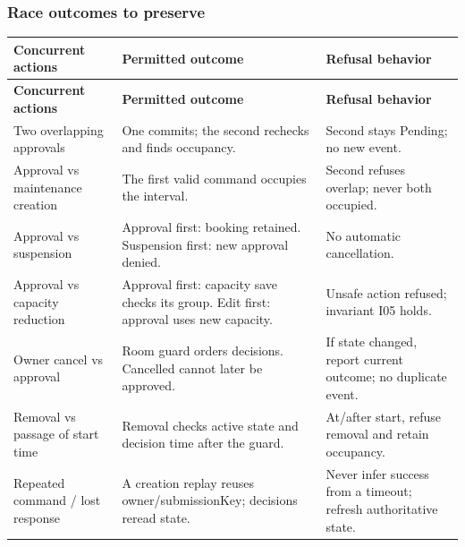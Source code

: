 \subsubsection{Race outcomes to preserve}

\begin{longtable}{|p{}|p{}|p{}|}

\hline

\textbf{Concurrent actions} & \textbf{Permitted outcome} & \textbf{Refusal behavior} \\ \hline

\endfirsthead

\hline

\textbf{Concurrent actions} & \textbf{Permitted outcome} & \textbf{Refusal behavior} \\ \hline

\endhead

Two overlapping approvals & One commits; the second rechecks and finds occupancy.\allowbreak{} & Second stays Pending; no new event.\allowbreak{} \\ \hline

Approval vs maintenance creation & The first valid command occupies the interval.\allowbreak{} & Second refuses overlap; never both occupied.\allowbreak{} \\ \hline

Approval vs suspension & Approval first: booking retained.\allowbreak{} Suspension first: new approval denied.\allowbreak{} & No automatic cancellation.\allowbreak{} \\ \hline

Approval vs capacity reduction & Approval first: capacity save checks its group.\allowbreak{} Edit first: approval uses new capacity.\allowbreak{} & Unsafe action refused; invariant I05 holds.\allowbreak{} \\ \hline

Owner cancel vs approval & Room guard orders decisions.\allowbreak{} Cancelled cannot later be approved.\allowbreak{} & If state changed, report current outcome; no duplicate event.\allowbreak{} \\ \hline

Removal vs passage of start time & Removal checks active state and decision time after the guard.\allowbreak{} & At/\allowbreak{}after start, refuse removal and retain occupancy.\allowbreak{} \\ \hline

Repeated command /\allowbreak{} lost response & A creation replay reuses owner/\allowbreak{}submission\allowbreak{}Key; decisions reread state.\allowbreak{} & Never infer success from a timeout; refresh authoritative state.\allowbreak{} \\ \hline

\end{longtable}

